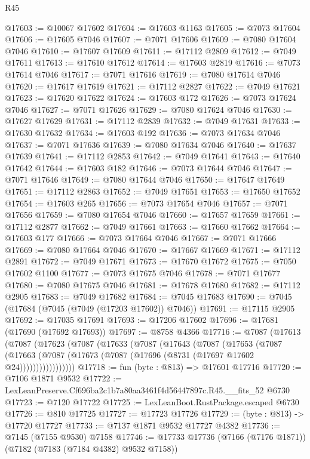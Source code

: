 \begin{lexlean}{R45}
\begin{coremodule}
{@17603 := @10067 @17602
@17604 := @17603 @1163
@17605 := @7073 @17604
@17606 := @17605 @7046
@17607 := @7071 @17606
@17609 := @7080 @17604 @7046
@17610 := @17607 @17609
@17611 := @17112 @2809
@17612 := @7049 @17611
@17613 := @17610 @17612
@17614 := @17603 @2819
@17616 := @7073 @17614 @7046
@17617 := @7071 @17616
@17619 := @7080 @17614 @7046
@17620 := @17617 @17619
@17621 := @17112 @2827
@17622 := @7049 @17621
@17623 := @17620 @17622
@17624 := @17603 @172
@17626 := @7073 @17624 @7046
@17627 := @7071 @17626
@17629 := @7080 @17624 @7046
@17630 := @17627 @17629
@17631 := @17112 @2839
@17632 := @7049 @17631
@17633 := @17630 @17632
@17634 := @17603 @192
@17636 := @7073 @17634 @7046
@17637 := @7071 @17636
@17639 := @7080 @17634 @7046
@17640 := @17637 @17639
@17641 := @17112 @2853
@17642 := @7049 @17641
@17643 := @17640 @17642
@17644 := @17603 @182
@17646 := @7073 @17644 @7046
@17647 := @7071 @17646
@17649 := @7080 @17644 @7046
@17650 := @17647 @17649
@17651 := @17112 @2863
@17652 := @7049 @17651
@17653 := @17650 @17652
@17654 := @17603 @265
@17656 := @7073 @17654 @7046
@17657 := @7071 @17656
@17659 := @7080 @17654 @7046
@17660 := @17657 @17659
@17661 := @17112 @2877
@17662 := @7049 @17661
@17663 := @17660 @17662
@17664 := @17603 @177
@17666 := @7073 @17664 @7046
@17667 := @7071 @17666
@17669 := @7080 @17664 @7046
@17670 := @17667 @17669
@17671 := @17112 @2891
@17672 := @7049 @17671
@17673 := @17670 @17672
@17675 := @7050 @17602 @1100
@17677 := @7073 @17675 @7046
@17678 := @7071 @17677
@17680 := @7080 @17675 @7046
@17681 := @17678 @17680
@17682 := @17112 @2905
@17683 := @7049 @17682
@17684 := @7045 @17683
@17690 := @7045 (@17684 (@7045 (@7049 (@17203 @17602)) @7046))
@17691 := @17115 @2905
@17692 := @17035 @17691
@17693 := @17206 @17602
@17696 := @17681 (@17690 (@17692 @17693))
@17697 := @8758 @4366
@17716 := @7087
    (@17613
      (@7087
        (@17623
          (@7087
            (@17633
              (@7087
                (@17643
                  (@7087
                    (@17653
                      (@7087
                        (@17663
                          (@7087 (@17673 (@7087 (@17696 (@8731 (@17697 @17602 @24)))))))))))))))))
@17718 := fun (byte : @813) => @17601 @17716
@17720 := @7106 @1871 @9532
@17722 := LexLeanPreserve.Cf696ba2c1b7a80aa3461f4d56447897c.R45.__fits_52 @6730
@17723 := @7120 @17722
@17725 := LexLeanBoot.RustPackage.escaped @6730
@17726 := @810 @17725
@17727 := @17723 @17726
@17729 := (byte : @813) -> @17720 @17727
@17733 := @7137 @1871 @9532 @17727 @4382
@17736 := @7145 (@7155 @9530) @7158
@17746 := @17733 @17736 (@7166 (@7176 @1871)) (@7182 (@7183 (@7184 @4382) @9532 @7158))
}
\end{coremodule}
\end{lexlean}
